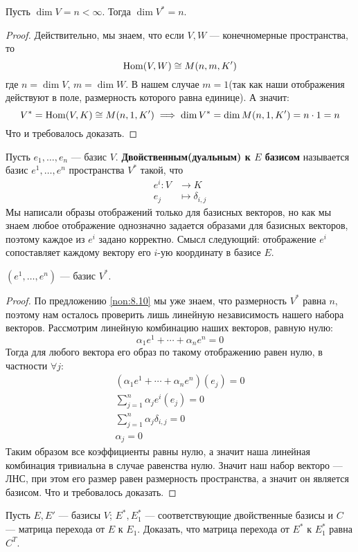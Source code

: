 \documentclass[../main.tex]{subfiles}
\begin{document}
\begin{theorem-non}
\label{non:8.10}
  Пусть $\dim V = n < \infty$. Тогда $\dim V^{*} = n$.
\end{theorem-non}
\begin{proof}
  Действительно, мы знаем, что если $V, W$ --- конечномерные пространства, то
  \begin{equation*}
    \operatorname{Hom}(V, W) \cong M(n, m, K')
  \end{equation*}
  где $n = \dim V,\, m = \dim W$. В нашем случае $m = 1$(так как наши отображения действуют в поле, размерность которого равна единице). А значит:
  \begin{equation*}
    V^{*} = \operatorname{Hom}(V, K) \cong M(n, 1, K') \implies \dim V^{*} = \dim M(n, 1, K') = n \cdot 1 = n
  \end{equation*}
  Что и требовалось доказать.
\end{proof}

\begin{definition}
  Пусть $e_1, \dotsc, e_n$ --- базис $V$. \textbf{Двойственным(дуальным) к $E$ базисом} называется базис $e^1, \dotsc, e^n$ пространства $V^{*}$ такой, что
  \begin{align*}
    e^i\colon V &\longrightarrow K \\
    e_j &\longmapsto \delta_{i,j}
  \end{align*}
  Мы написали образы отображений только для базисных векторов, но как мы знаем любое отображение однозначно задается образами для базисных векторов, поэтому каждое из $e^i$ задано корректно. Смысл следующий: отображение $e^i$ сопоставляет каждому вектору его $i$-ую координату в базисе $E$.
\end{definition}

\begin{theorem-non}
  $(e^1, \dotsc, e^n)$ --- базис $V^{*}$.
\end{theorem-non}
\begin{proof}
  По предложению \ref{non:8.10} мы уже знаем, что размерность $V^{*}$ равна $n$, поэтому нам осталось проверить лишь линейную независимость нашего набора векторов. Рассмотрим линейную комбинацию наших векторов, равную нулю:
  \begin{equation*}
    \alpha_1 e^1 + \dotsb + \alpha_n e^n = 0
  \end{equation*}
  Тогда для любого вектора его образ по такому отображению равен нулю, в частности $\forall j$:
  \begin{equation*}
    \begin{gathered}
      (\alpha_1 e^1 + \dotsb + \alpha_n e^n)(e_j) = 0 \\
      \sum\limits_{j = 1}^{n} \alpha_j e^{i}(e_j) = 0 \\
      \sum\limits_{j = 1}^{n} \alpha_j \delta_{i, j} = 0\\
      \alpha_j = 0
    \end{gathered}
  \end{equation*}
  Таким образом все коэффициенты равны нулю, а значит наша линейная комбинация тривиальна в случае равенства нулю. Значит наш набор векторо --- ЛНС, при этом его размер равен размерность пространства, а значит он является базисом. Что и требовалось доказать.
\end{proof}

\begin{exercise}
  Пусть $E, E'$ --- базисы $V$; $E^{*}, E_1^{*}$ --- соответствующие двойственные базисы и $C$ --- матрица перехода от $E$ к $E_1$. Доказать, что матрица перехода от $E^{*}$ к $E_1^{*}$ равна $C^T$.
\end{exercise}
\end{document}
